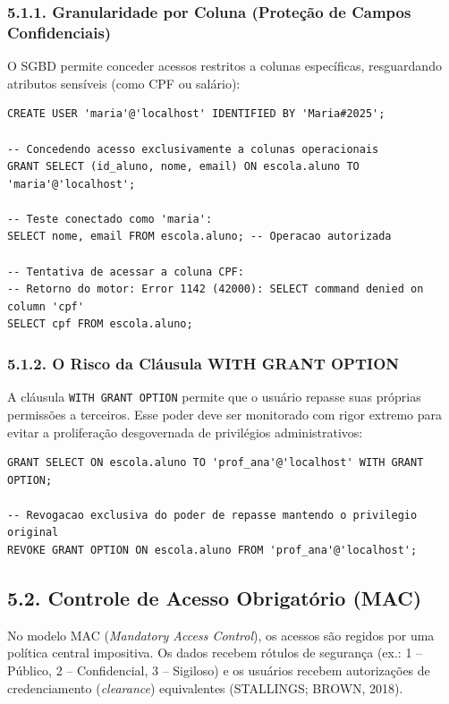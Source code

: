 \subsubsection*{5.1.1. Granularidade por Coluna (Proteção de Campos Confidenciais)}

O SGBD permite conceder acessos restritos a colunas específicas, resguardando atributos sensíveis (como CPF ou salário):

\begin{lstlisting}
CREATE USER 'maria'@'localhost' IDENTIFIED BY 'Maria#2025';

-- Concedendo acesso exclusivamente a colunas operacionais
GRANT SELECT (id_aluno, nome, email) ON escola.aluno TO 'maria'@'localhost';

-- Teste conectado como 'maria':
SELECT nome, email FROM escola.aluno; -- Operacao autorizada

-- Tentativa de acessar a coluna CPF:
-- Retorno do motor: Error 1142 (42000): SELECT command denied on column 'cpf'
SELECT cpf FROM escola.aluno;
\end{lstlisting}

\subsubsection*{5.1.2. O Risco da Cláusula WITH GRANT OPTION}

A cláusula \texttt{WITH GRANT OPTION} permite que o usuário repasse suas próprias permissões a terceiros. Esse poder deve ser monitorado com rigor extremo para evitar a proliferação desgovernada de privilégios administrativos:

\begin{lstlisting}
GRANT SELECT ON escola.aluno TO 'prof_ana'@'localhost' WITH GRANT OPTION;

-- Revogacao exclusiva do poder de repasse mantendo o privilegio original
REVOKE GRANT OPTION ON escola.aluno FROM 'prof_ana'@'localhost';
\end{lstlisting}

\subsection*{5.2. Controle de Acesso Obrigatório (MAC)}

No modelo MAC (\textit{Mandatory Access Control}), os acessos são regidos por uma política central impositiva. Os dados recebem rótulos de segurança (ex.: 1 -- Público, 2 -- Confidencial, 3 -- Sigiloso) e os usuários recebem autorizações de credenciamento (\textit{clearance}) equivalentes (STALLINGS; BROWN, 2018).

